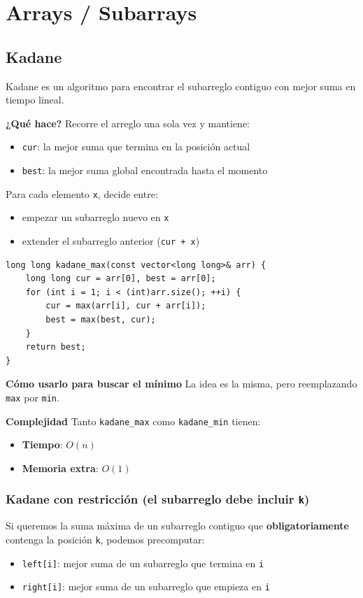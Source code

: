 \chapter{Arrays / Subarrays}


\section{Kadane}
Kadane es un algoritmo para encontrar el subarreglo contiguo con mejor suma en tiempo lineal.

\textbf{¿Qué hace?}
Recorre el arreglo una sola vez y mantiene:
\begin{itemize}
\item \texttt{cur}: la mejor suma que termina en la posición actual
\item \texttt{best}: la mejor suma global encontrada hasta el momento
\end{itemize}

Para cada elemento \texttt{x}, decide entre:
\begin{itemize}
\item empezar un subarreglo nuevo en \texttt{x}
\item extender el subarreglo anterior (\texttt{cur + x})
\end{itemize}

\begin{lstlisting}[style=cppstyle, caption={Kadane para subarreglo de suma maxima}]
long long kadane_max(const vector<long long>& arr) {
	long long cur = arr[0], best = arr[0];
	for (int i = 1; i < (int)arr.size(); ++i) {
		cur = max(arr[i], cur + arr[i]);
		best = max(best, cur);
	}
	return best;
}
\end{lstlisting}

\textbf{Cómo usarlo para buscar el mínimo}
La idea es la misma, pero reemplazando \texttt{max} por \texttt{min}.

\textbf{Complejidad}
Tanto \texttt{kadane\_max} como \texttt{kadane\_min} tienen:
\begin{itemize}
\item \textbf{Tiempo}: $O(n)$
\item \textbf{Memoria extra}: $O(1)$
\end{itemize}

\subsection{Kadane con restricción (el subarreglo debe incluir \texttt{k})}
Si queremos la suma máxima de un subarreglo contiguo que \textbf{obligatoriamente} contenga la posición \texttt{k}, podemos precomputar:
\begin{itemize}
\item \texttt{left[i]}: mejor suma de un subarreglo que termina en \texttt{i}
\item \texttt{right[i]}: mejor suma de un subarreglo que empieza en \texttt{i}
\end{itemize}

